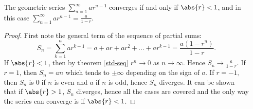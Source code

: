 \documentclass[../real_analysis.tex]{subfiles}
\begin{document}
        \begin{theorem}\label{geometric-series}
            The geometric series $\sum_{n=1}^\infty ar^{n-1}$ converges if and only if $\abs{r}<1$, and in this case $\sum_{n=1}^\infty ar^{n-1}=\frac{a}{1-r}$.
        \end{theorem}
        \begin{proof}
            First note the general term of the sequence of partial sums:
            \begin{equation}
                S_n=\sum_{k=1}^n ar^{k-1}=a+ar+ar^2+\dots+ar^{k-1}=\frac{a(1-r^n)}{1-r}\tag{$r\neq1$}. %
            \end{equation}
            If $\abs{r}<1$, then by theorem \ref{std-seq} $r^n\to0$ as $n\to\infty$. Hence $S_n\to\frac{a}{1-r}$. If $r=1$, then $S_n=an$ which tends to $\pm\infty$ depending on the sign of $a$. If $r=-1$, then $S_n$ is 0 if $n$ is even and $a$ if $n$ is odd, hence $S_n$ diverges. It can be shown that if $\abs{r}>1$, $S_n$ diverges, hence all the cases are covered and the only way the series can converge is if $\abs{r}<1$.
        \end{proof}
\end{document}
